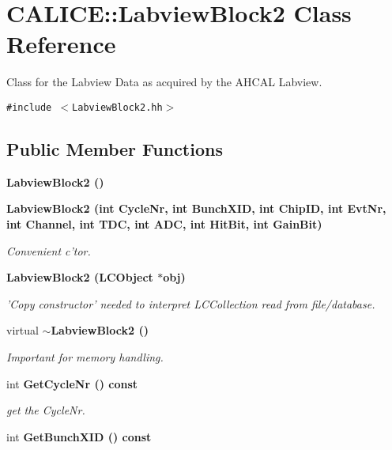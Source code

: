 \section{CALICE::Labview\-Block2 Class Reference}
\label{classCALICE_1_1LabviewBlock2}
Class for the Labview Data as acquired by the AHCAL Labview.  


{\tt \#include $<$Labview\-Block2.hh$>$}

\subsection*{Public Member Functions}
\begin{CompactItemize}
\item 
\bf{Labview\-Block2} ()\label{classCALICE_1_1LabviewBlock2_830fcafaec5b665750a88922ce3085da}

\item 
\bf{Labview\-Block2} (int Cycle\-Nr, int Bunch\-XID, int Chip\-ID, int Evt\-Nr, int Channel, int TDC, int ADC, int Hit\-Bit, int Gain\-Bit)\label{classCALICE_1_1LabviewBlock2_ab162345c6e6d43f1427599687983fc0}

\begin{CompactList}\small\item\em Convenient c'tor. \item\end{CompactList}\item 
\bf{Labview\-Block2} (LCObject $\ast$obj)\label{classCALICE_1_1LabviewBlock2_29a4961aceb315d67bec264204c0fe0a}

\begin{CompactList}\small\item\em 'Copy constructor' needed to interpret LCCollection read from file/database. \item\end{CompactList}\item 
virtual \bf{$\sim$Labview\-Block2} ()\label{classCALICE_1_1LabviewBlock2_55872fe1ab3b795ad1b83e305eb38bbd}

\begin{CompactList}\small\item\em Important for memory handling. \item\end{CompactList}\item 
int \bf{Get\-Cycle\-Nr} () const \label{classCALICE_1_1LabviewBlock2_fe909a3aa0edf8164957e1808b21bae1}

\begin{CompactList}\small\item\em get the Cycle\-Nr. \item\end{CompactList}\item 
int \bf{Get\-Bunch\-XID} () const \label{classCALICE_1_1LabviewBlock2_8fe2c3dc821a2443030faa126cfa89bd}


\end{CompactItemize}
